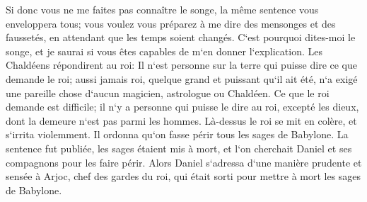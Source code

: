 \verse Si donc vous ne me faites pas connaître le songe, la même sentence vous enveloppera tous; vous voulez vous préparez à me dire des mensonges et des faussetés, en attendant que les temps soient changés. C`est pourquoi dites-moi le songe, et je saurai si vous êtes capables de m`en donner l`explication. 
\verse Les Chaldéens répondirent au roi: Il n`est personne sur la terre qui puisse dire ce que demande le roi; aussi jamais roi, quelque grand et puissant qu`il ait été, n`a exigé une pareille chose d`aucun magicien, astrologue ou Chaldéen. 
\verse Ce que le roi demande est difficile; il n`y a personne qui puisse le dire au roi, excepté les dieux, dont la demeure n`est pas parmi les hommes. 
\verse Là-dessus le roi se mit en colère, et s`irrita violemment. Il ordonna qu`on fasse périr tous les sages de Babylone. 
\verse La sentence fut publiée, les sages étaient mis à mort, et l`on cherchait Daniel et ses compagnons pour les faire périr. 
\verse Alors Daniel s`adressa d`une manière prudente et sensée à Arjoc, chef des gardes du roi, qui était sorti pour mettre à mort les sages de Babylone. 
